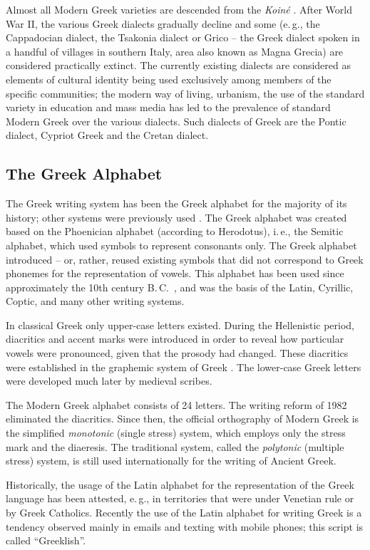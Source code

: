 \begin{multicols}{2}
Almost all Modern Greek varieties are descended from the \textit{Koiné} \cite{Bro1}. After World War II, the various Greek dialects gradually decline and some (e.\,g., the Cappadocian dialect, the Tsakonia dialect or Grico -- the Greek dialect spoken in a handful of villages in southern Italy, area also known as Magna Grecia) are considered practically extinct. The currently existing dialects are considered as elements of cultural identity being used exclusively among members of the specific communities; the modern way of living, urbanism, the use of the standard variety in education and mass media has led to the prevalence of standard Modern Greek over the various dialects. Such dialects of Greek are the Pontic dialect, Cypriot Greek and the Cretan dialect.

\subsection{The Greek Alphabet}

The Greek writing system has been the Greek alphabet for the majority of its history; other systems were previously used \cite{Kopi1}. The Greek alphabet was created based on the Phoenician alphabet (according to Herodotus), i.\,e., the Semitic alphabet, which used symbols to represent consonants only. The Greek alphabet introduced – or, rather, reused existing symbols that did not correspond to Greek phonemes for the representation of vowels. This alphabet has been used since approximately the 10th century B.\,C.~\cite{Tonn1}, and was the basis of the Latin, Cyrillic, Coptic, and many other writing systems.

In classical Greek only upper-case letters existed. During the Hellenistic period, diacritics and accent marks were introduced in order to reveal how particular vowels were pronounced, given that the prosody had changed. These diacritics were established in the graphemic system of Greek \cite{Chris1}. The lower-case Greek letters were developed much later by medieval scribes.

The Modern Greek alphabet consists of 24 letters. The writing reform of 1982 eliminated the diacritics. Since then, the official orthography of Modern Greek is the simplified \textit{monotonic} (single stress) system, which employs only the stress mark and the diaeresis. The traditional system, called the \textit{polytonic} (multiple stress) system, is still used internationally for the writing of Ancient Greek.

Historically, the usage of the Latin alphabet for the representation of the Greek language has been attested, e.\,g., in territories that were under Venetian rule or by Greek Catholics. Recently the use of the Latin alphabet for writing Greek is a tendency observed mainly in emails and texting with mobile phones; this script is called “Greeklish”.


\end{multicols}
